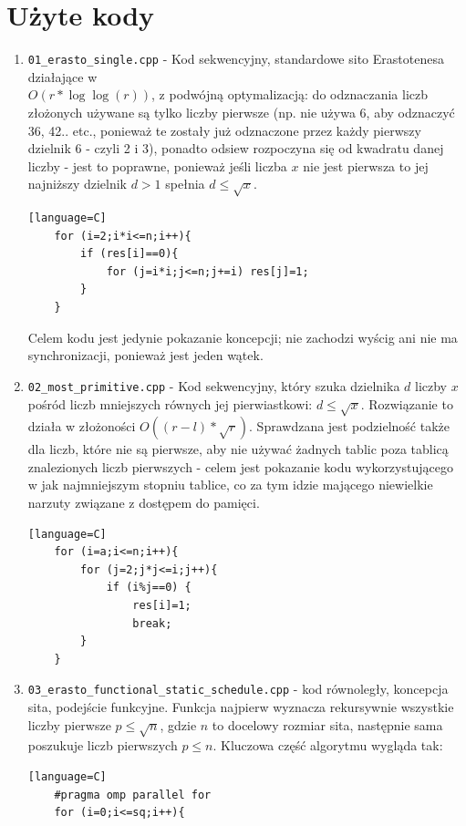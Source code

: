 \documentclass[12pt]{article}
\begin{document}
\section{Użyte kody}
\begin {enumerate}
	\item \texttt{01\_erasto\_single.cpp} - Kod sekwencyjny, standardowe sito Erastotenesa działające w\\ \(O(r*\log \log(r))\), z podwójną optymalizacją: do odznaczania liczb złożonych używane są tylko liczby pierwsze (np. nie używa 6, aby odznaczyć 36, 42.. etc., ponieważ te zostały już odznaczone przez każdy pierwszy dzielnik 6 - czyli 2 i 3), ponadto odsiew rozpoczyna się od kwadratu danej liczby - jest to poprawne, ponieważ jeśli liczba \(x\) nie jest pierwsza to jej najniższy dzielnik \(d>1\) spełnia \(d\le \sqrt{x}\).
	\begin{lstlisting}[style=mystyle, caption= Sito Erastotenesa][language=C]
	for (i=2;i*i<=n;i++){
		if (res[i]==0){
			for (j=i*i;j<=n;j+=i) res[j]=1;
		}
	}
	\end{lstlisting}
	Celem kodu jest jedynie pokazanie koncepcji; nie zachodzi wyścig ani nie ma synchronizacji, ponieważ jest jeden wątek.
	\item \texttt{02\_most\_primitive.cpp} - Kod sekwencyjny, który szuka dzielnika \(d\) liczby \(x\) pośród liczb mniejszych równych jej pierwiastkowi: \(d \le \sqrt{x}\). Rozwiązanie to działa w złożoności \(O((r-l)*\sqrt{r})\). Sprawdzana jest podzielność także dla liczb, które nie są pierwsze, aby nie używać żadnych tablic poza tablicą znalezionych liczb pierwszych - celem jest pokazanie kodu wykorzystującego w jak najmniejszym stopniu tablice, co za tym idzie mającego niewielkie narzuty związane z dostępem do pamięci.
	\begin{lstlisting}[style=mystyle, caption= Rozwiązanie pierwiastkowe][language=C]	
	for (i=a;i<=n;i++){
		for (j=2;j*j<=i;j++){
			if (i%j==0) {
				res[i]=1;
				break;
		}
	}
	\end{lstlisting}
	\item \texttt{03\_erasto\_functional\_static\_schedule.cpp} - kod równoległy, koncepcja sita, podejście funkcyjne. Funkcja najpierw wyznacza rekursywnie wszystkie liczby pierwsze \(p\le \sqrt{n}\), gdzie \(n\) to docelowy rozmiar sita, następnie sama poszukuje liczb pierwszych \(p\le n\). Kluczowa część algorytmu wygląda tak:
	\begin{lstlisting}[style=mystyle, caption= Sito funkcyjne ze static schedulingiem][language=C]
	#pragma omp parallel for
	for (i=0;i<=sq;i++){

\end{lstlisting}
\end{enumerate}
\end{document}
